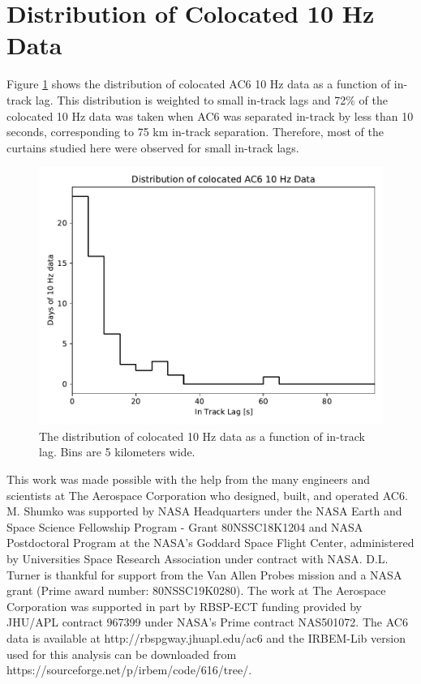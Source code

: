\documentclass[draft]{agujournal2019}
\begin{document}
\appendix

\section{Distribution of Colocated 10 Hz Data}
Figure \ref{a_10Hz_dist} shows the distribution of colocated AC6 10 Hz data as a function of in-track lag. This distribution is weighted to small in-track lags and 72\% of the colocated 10 Hz data was taken when AC6 was separated in-track by less than 10 seconds, corresponding to 75 km in-track separation. Therefore, most of the curtains studied here were observed for small in-track lags.

\begin{figure}
\includegraphics[width=\textwidth]{a_10hz_dist.pdf}
\caption{The distribution of colocated 10 Hz data as a function of in-track lag. Bins are 5 kilometers wide.}
\label{a_10Hz_dist}
\end{figure}

\acknowledgments
This work was made possible with the help from the many engineers and scientists at The Aerospace Corporation who designed, built, and operated AC6. M. Shumko was supported by NASA Headquarters under the NASA Earth and Space Science Fellowship Program - Grant 80NSSC18K1204 and NASA Postdoctoral Program at the NASA's Goddard Space Flight Center, administered by Universities Space Research Association under contract with NASA. D.L. Turner is thankful for support from the Van Allen Probes mission and a NASA grant (Prime award number: 80NSSC19K0280). The work at The Aerospace Corporation was supported in part by RBSP-ECT funding provided by JHU/APL contract 967399 under NASA's Prime contract NAS501072. The AC6 data is available at http://rbspgway.jhuapl.edu/ac6 and the IRBEM-Lib version used for this analysis can be downloaded from https://sourceforge.net/p/irbem/code/616/tree/.


%
\end{document}
